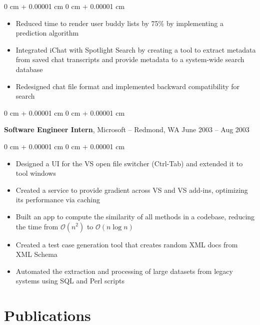 \documentclass[10pt, letterpaper]{article}
\newenvironment{highlights}{
    \begin{itemize}[
        topsep=0.10 cm,
        parsep=0.10 cm,
        partopsep=0pt,
        itemsep=0pt,
        leftmargin=0 cm + 10pt
    ]
}{
    \end{itemize}
} %
\newenvironment{onecolentry}{
    \begin{adjustwidth}{
        0 cm + 0.00001 cm
    }{
        0 cm + 0.00001 cm
    }
}{
    \end{adjustwidth}
} %
\newenvironment{twocolentry}[2][]{
    \onecolentry
    \def\secondColumn{#2}
    \setcolumnwidth{\fill, 4.5 cm}
    \begin{paracol}{2}
}{
    \switchcolumn \raggedleft \secondColumn
    \end{paracol}
    \endonecolentry
} %
\begin{document}
\vspace{0.10 cm}
\begin{onecolentry}
      \begin{highlights}
            \item Reduced time to render user buddy lists by 75\% by implementing a prediction
            algorithm
            \item Integrated iChat with Spotlight Search by creating a tool to extract metadata
            from saved chat transcripts and provide metadata to a system-wide search
            database
            \item Redesigned chat file format and implemented backward compatibility for search
      \end{highlights}
\end{onecolentry}

\vspace{0.2 cm}

\begin{twocolentry}{
            June 2003 – Aug 2003
      }
      \textbf{Software Engineer Intern}, Microsoft -- Redmond, WA\end{twocolentry}

\vspace{0.10 cm}
\begin{onecolentry}
      \begin{highlights}
            \item Designed a UI for the VS open file switcher (Ctrl-Tab) and extended it to tool
            windows
            \item Created a service to provide gradient across VS and VS add-ins, optimizing its
            performance via caching
            \item Built an app to compute the similarity of all methods in a codebase, reducing
            the time from $\mathcal{O}(n^2)$ to $\mathcal{O}(n \log n)$
            \item Created a test case generation tool that creates random XML docs from XML
            Schema
            \item Automated the extraction and processing of large datasets from legacy systems
            using SQL and Perl scripts
      \end{highlights}
\end{onecolentry}

\section{Publications}
\end{document}
